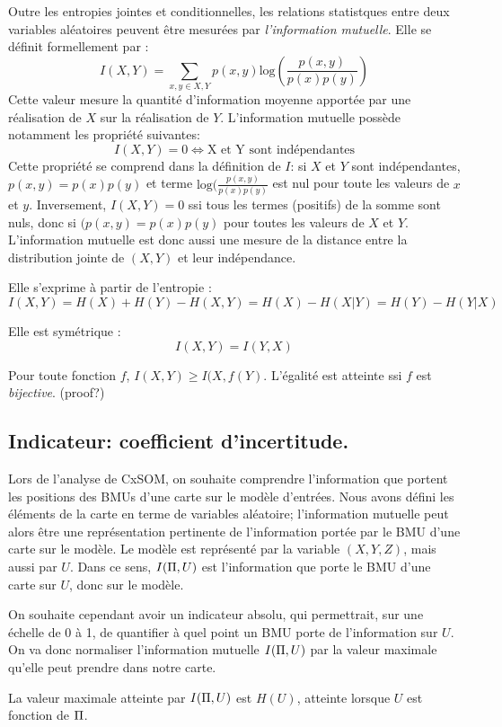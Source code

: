 Outre les entropies jointes et conditionnelles, les relations statistques entre deux variables aléatoires peuvent être mesurées par \emph{l'information mutuelle}. Elle se définit formellement par : 
$$ I(X,Y) = \sum_{x,y \in X,Y}{p(x,y)\textrm{log}(\frac{p(x,y)}{p(x)p(y)})}$$
Cette valeur mesure la quantité d'information moyenne apportée par une réalisation de $X$ sur la réalisation de $Y$. L'information mutuelle possède notamment les propriété suivantes: 
$$I(X,Y) = 0 \Leftrightarrow \textrm{X et Y sont indépendantes}$$
Cette propriété se comprend dans la définition de $I$: si $X$ et $Y$ sont indépendantes, $p(x,y)=p(x)p(y)$ et terme $\textrm{log}(\frac{p(x,y)}{p(x)p(y)}$ est nul pour toute les valeurs de $x$ et $y$. Inversement, $I(X,Y) =0$ ssi tous les termes (positifs) de la somme sont nuls, donc si $(p(x,y)=p(x)p(y)$ pour toutes les valeurs de $X$ et $Y$. L'information mutuelle est donc aussi une mesure de la distance entre la distribution jointe de $(X,Y)$ et leur indépendance.


Elle s'exprime à partir de l'entropie : $$I(X,Y) = H(X) + H(Y) - H(X,Y) = H(X) - H(X|Y) = H(Y) - H(Y|X)$$

Elle est symétrique : $$I(X,Y) = I(Y,X)$$

Pour toute fonction $f$, $I(X,Y) \geq I(X,f(Y)$. L'égalité est atteinte ssi $f$ est \emph{bijective}. (proof?)

\subsection{Indicateur: coefficient d'incertitude.}

Lors de l'analyse de CxSOM, on souhaite comprendre l'information que portent les positions des BMUs d'une carte sur le modèle d'entrées. Nous avons défini les éléments de la carte en terme de variables aléatoire; l'information mutuelle peut alors être une représentation pertinente de l'information portée par le BMU d'une carte sur le modèle. Le modèle est représenté par la variable $(X,Y,Z)$, mais aussi par $U$. Dans ce sens, $I(\Pi, U)$ est l'information que porte le BMU d'une carte sur $U$, donc sur le modèle. 

On souhaite cependant avoir un indicateur absolu, qui permettrait, sur une échelle de 0 à 1, de quantifier à quel point un BMU porte de l'information sur $U$. On va donc normaliser l'information mutuelle $I(\Pi,U)$ par la valeur maximale qu'elle peut prendre dans notre carte.
\begin{propriete}
La valeur maximale atteinte par $I(\Pi,U)$ est $H(U)$, atteinte lorsque $U$ est fonction de $\Pi$.
\end{propriete}

